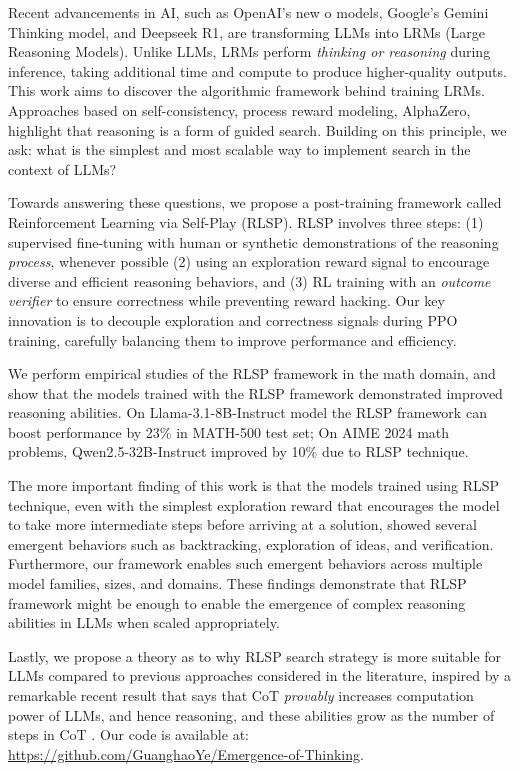 Recent advancements in AI, such as OpenAI's new o models, Google's Gemini Thinking model, and Deepseek R1, are transforming LLMs into LRMs (Large Reasoning Models). Unlike LLMs, LRMs perform {\em thinking or reasoning} during inference, taking additional time and compute to produce higher-quality outputs. 
This work aims to discover the algorithmic framework behind  training LRMs. 
Approaches based on self-consistency, process reward modeling, AlphaZero, highlight that reasoning is a form of guided search. Building on this principle, we ask: what is the simplest and most scalable way to implement search in the context of LLMs?  

\smallskip

Towards answering these questions, we propose a post-training framework called Reinforcement Learning via Self-Play (RLSP). 
RLSP involves three steps: (1) supervised fine-tuning with human or synthetic demonstrations of the reasoning {\em process}, whenever possible (2) using an exploration reward signal to encourage diverse and efficient reasoning behaviors, and (3) RL training with an {\em outcome verifier} to ensure correctness while preventing reward hacking. Our key innovation is to decouple exploration and correctness signals during PPO training, carefully balancing them to improve performance and efficiency.

\smallskip

We perform empirical studies of the RLSP framework in the math domain, and show that
the models trained with the RLSP framework demonstrated improved reasoning abilities.
On Llama-3.1-8B-Instruct model the RLSP framework can boost performance by 23\% in MATH-500 test set;  
On AIME 2024 math problems, Qwen2.5-32B-Instruct improved by 10\% due to RLSP technique.

\smallskip

The more important finding of this work is that the models trained using RLSP technique, even with the simplest exploration reward that encourages the model to take more intermediate steps before arriving at a solution, showed several emergent behaviors such as backtracking, exploration of ideas, and verification. 
Furthermore, our framework enables such emergent behaviors across multiple model families, sizes, and domains.
These findings demonstrate that RLSP framework might be enough to enable the emergence of complex reasoning abilities in LLMs when scaled appropriately.

\smallskip

Lastly, we propose a theory as to why RLSP search strategy is more suitable for LLMs compared to previous approaches considered in the literature, inspired by a remarkable recent result that says that CoT {\em provably} increases computation power of LLMs, and hence reasoning, and these abilities grow as the number of steps in CoT \cite{li2024chain,merrill2023expresssive}. Our code is available at: \url{https://github.com/GuanghaoYe/Emergence-of-Thinking}.
